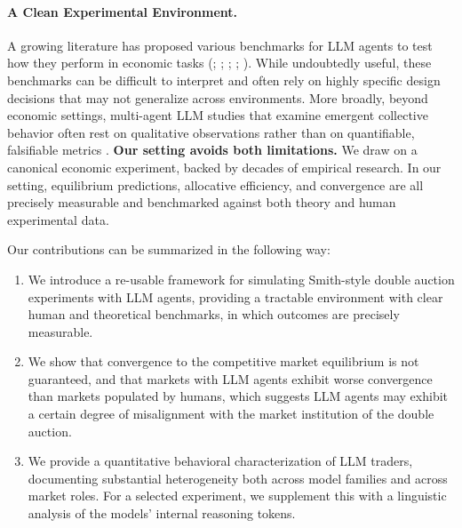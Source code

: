 \documentclass[letterpaper]{article} %
\begin{document}
\paragraph{A Clean Experimental Environment.} A growing literature has proposed various benchmarks for LLM agents to test how they perform in economic tasks (\citealp{yuFinConSynthesizedLLM2024}; \citealp{xieFinBenHolisticFinancial2024}; \citealp{ramanSTEERAssessingEconomic2024b}; \citealp{backlundVendingBenchBenchmarkLongTerm2025a}; \citealp{fishEconEvalsBenchmarksLitmus2025}). While undoubtedly useful, these benchmarks can be difficult to interpret and often rely on highly specific design decisions that may not generalize across environments. More broadly, beyond economic settings, multi-agent LLM studies that examine emergent collective behavior often rest on qualitative observations rather than on quantifiable, falsifiable metrics \citep{la2026large}. \textbf{Our setting avoids both limitations.} We draw on a canonical economic experiment, backed by decades of empirical research. In our setting, equilibrium predictions, allocative efficiency, and convergence are all precisely measurable and benchmarked against both theory and human experimental data.

%

Our contributions can be summarized in the following way:
\begin{enumerate}
  \item We introduce a re-usable framework for simulating Smith-style double auction experiments with LLM agents, providing a tractable environment with clear human and theoretical benchmarks, in which outcomes are precisely measurable.
  
  \item We show that convergence to the competitive market equilibrium is not guaranteed, and that markets with LLM agents exhibit worse convergence than markets populated by humans, which suggests LLM agents may exhibit a certain degree of misalignment with the market institution of the double auction.
  
  \item We provide a quantitative behavioral characterization of LLM traders, documenting substantial heterogeneity both across model families and across market roles. For a selected experiment, we supplement this with a linguistic analysis of the models' internal reasoning tokens.
  
\end{enumerate}
\end{document}

